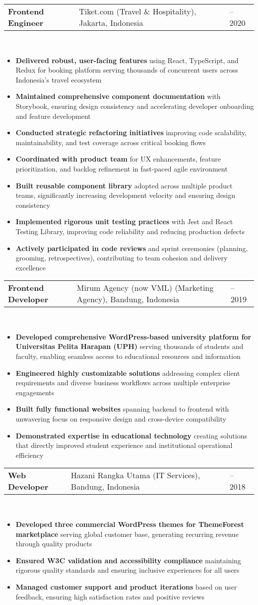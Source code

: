\documentclass[a4paper, 11pt]{article}
\newcommand{\resumeItem}[1]{
  \item\small{
    {#1 \vspace{-2pt}}
  }
}
\newcommand{\resumeSubheading}[4]{
  \vspace{-2pt}\item
    \begin{tabularx}{0.987\textwidth}[t]{
  >{\raggedright\arraybackslash}X
  >{\centering\arraybackslash}X
  >{\raggedleft\arraybackslash}X }
      \textbf{#1} & #2 & #3 \\
    \end{tabularx}
    \textit{\small#4}\\
    \vspace{-7pt}
}
\newcommand{\resumeItemListStart}{\begin{itemize}[leftmargin=0.22in]}
\newcommand{\resumeItemListEnd}{\end{itemize}\vspace{-20pt}}
\begin{document}
        \resumeSubheading
            {Frontend Engineer}{Tiket.com (Travel \& Hospitality), Jakarta, Indonesia}{2019 -- 2020}{}
            \resumeItemListStart
                \resumeItem{\textbf{Delivered robust, user-facing features} using React, TypeScript, and Redux for booking platform serving thousands of concurrent users across Indonesia's travel ecosystem}
                \resumeItem{\textbf{Maintained comprehensive component documentation} with Storybook, ensuring design consistency and accelerating developer onboarding and feature development}
                \resumeItem{\textbf{Conducted strategic refactoring initiatives} improving code scalability, maintainability, and test coverage across critical booking flows}
                \resumeItem{\textbf{Coordinated with product team} for UX enhancements, feature prioritization, and backlog refinement in fast-paced agile environment}
                \resumeItem{\textbf{Built reusable component library} adopted across multiple product teams, significantly increasing development velocity and ensuring design consistency}
                \resumeItem{\textbf{Implemented rigorous unit testing practices} with Jest and React Testing Library, improving code reliability and reducing production defects}
                \resumeItem{\textbf{Actively participated in code reviews} and sprint ceremonies (planning, grooming, retrospectives), contributing to team cohesion and delivery excellence}
            \resumeItemListEnd

        \resumeSubheading
            {Frontend Developer}{Mirum Agency (now VML) (Marketing Agency), Bandung, Indonesia}{2018 -- 2019}{}
            \resumeItemListStart
                \resumeItem{\textbf{Developed comprehensive WordPress-based university platform for Universitas Pelita Harapan (UPH)} serving thousands of students and faculty, enabling seamless access to educational resources and information}
                \resumeItem{\textbf{Engineered highly customizable solutions} addressing complex client requirements and diverse business workflows across multiple enterprise engagements}
                \resumeItem{\textbf{Built fully functional websites} spanning backend to frontend with unwavering focus on responsive design and cross-device compatibility}
                \resumeItem{\textbf{Demonstrated expertise in educational technology} creating solutions that directly improved student experience and institutional operational efficiency}
            \resumeItemListEnd

        \resumeSubheading
            {Web Developer}{Hazani Rangka Utama (IT Services), Bandung, Indonesia}{2017 -- 2018}{}
            \resumeItemListStart
                \resumeItem{\textbf{Developed three commercial WordPress themes for ThemeForest marketplace} serving global customer base, generating recurring revenue through quality products}
                \resumeItem{\textbf{Ensured W3C validation and accessibility compliance} maintaining rigorous quality standards and ensuring inclusive experiences for all users}
                \resumeItem{\textbf{Managed customer support and product iterations} based on user feedback, ensuring high satisfaction rates and positive reviews}
            \resumeItemListEnd
\end{document}
